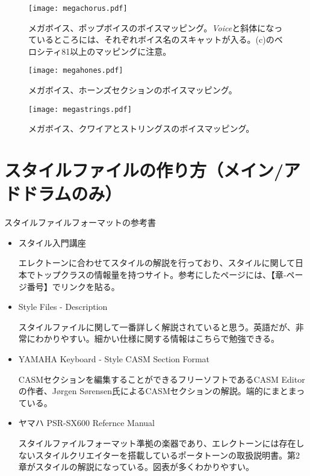 \documentclass[uplatex, 10pt, dvipdfmx]{jsarticle}
\numberwithin{equation}{section}
\begin{document}
\begin{figure}[h]
  \centering
  \texttt{[image: megachorus.pdf]}
  \caption{メガボイス、ポップボイスのボイスマッピング。\textit{Voice}と斜体になっているところには、それぞれボイス名のスキャットが入る。(c)のベロシティ81以上のマッピングに注意。}
\end{figure}
\clearpage
{}
\begin{figure}[h]
  \centering
  \texttt{[image: megahones.pdf]}
  \caption{メガボイス、ホーンズセクションのボイスマッピング。}
\end{figure}
\clearpage
{}
\begin{figure}[h]
  \centering
  \texttt{[image: megastrings.pdf]}
  \caption{メガボイス、クワイアとストリングスのボイスマッピング。}
  \label{figmegaend}
\end{figure}

\clearpage
\section{スタイルファイルの作り方（メイン/アドドラムのみ）}
\begin{itembox}{スタイルファイルフォーマットの参考書}
\begin{itemize}
\item スタイル入門講座\cite{スタイル}

エレクトーンに合わせてスタイルの解説を行っており、スタイルに関して日本でトップクラスの情報量を持つサイト。参考にしたページには、【章-ページ番号】でリンクを貼る。

\item Style Files - Description\cite{style}

スタイルファイルに関して一番詳しく解説されていると思う。英語だが、非常にわかりやすい。細かい仕様に関する情報はこちらで勉強できる。

\item YAMAHA Keyboard - Style CASM Section Format\cite{CASMeditor}

CASMセクションを編集することができるフリーソフトであるCASM Editorの作者、Jørgen Sørensen氏によるCASMセクションの解説。端的にまとまっている。

\item ヤマハ PSR-SX600 Refernce Manual\cite{PSR}

スタイルファイルフォーマット準拠の楽器であり、エレクトーンには存在しないスタイルクリエイターを搭載しているポータトーンの取扱説明書。第2章がスタイルの解説になっている。図表が多くわかりやすい。
\end{itemize}
\end{itembox}
\end{document}

